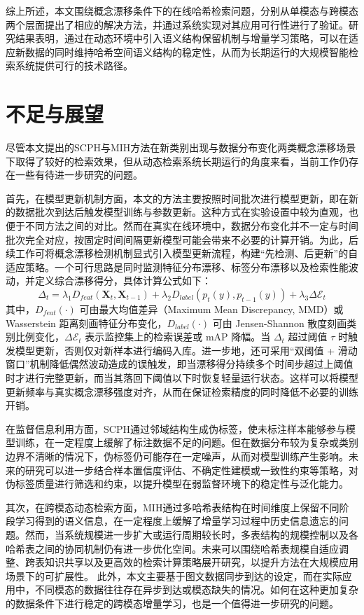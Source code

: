 综上所述，本文围绕概念漂移条件下的在线哈希检索问题，分别从单模态与跨模态两个层面提出了相应的解决方法，并通过系统实现对其应用可行性进行了验证。研究结果表明，通过在动态环境中引入语义结构保留机制与增量学习策略，可以在适应新数据的同时维持哈希空间语义结构的稳定性，从而为长期运行的大规模智能检索系统提供可行的技术路径。

\section{不足与展望}
尽管本文提出的SCPH与MIH方法在新类别出现与数据分布变化两类概念漂移场景下取得了较好的检索效果，但从动态检索系统长期运行的角度来看，当前工作仍存在一些有待进一步研究的问题。

首先，在模型更新机制方面，本文的方法主要按照时间批次进行模型更新，即在新的数据批次到达后触发模型训练与参数更新。这种方式在实验设置中较为直观，也便于不同方法之间的对比。然而在真实在线环境中，数据分布变化并不一定与时间批次完全对应，按固定时间间隔更新模型可能会带来不必要的计算开销。为此，后续工作可将概念漂移检测机制显式引入模型更新流程，构建“先检测、后更新”的自适应策略。一个可行思路是同时监测特征分布漂移、标签分布漂移以及检索性能波动，并定义综合漂移得分，具体计算公式如下：
\begin{equation}
  \Delta_t = \lambda_1 D_{feat}(\mathbf{X}_t,\mathbf{X}_{t-1}) + \lambda_2 D_{label}(p_t(y),p_{t-1}(y)) + \lambda_3 \Delta \mathcal{E}_t
\end{equation}
其中，$D_{feat}(\cdot)$ 可由最大均值差异（Maximum Mean Discrepancy, MMD）或 Wasserstein 距离刻画特征分布变化，$D_{label}(\cdot)$ 可由 Jensen-Shannon 散度刻画类别比例变化，$\Delta \mathcal{E}_t$ 表示监控集上的检索误差或 mAP 降幅。当 $\Delta_t$ 超过阈值 $\tau$ 时触发模型更新，否则仅对新样本进行编码入库。进一步地，还可采用“双阈值 + 滑动窗口”机制降低偶然波动造成的误触发，即当漂移得分持续多个时间步超过上阈值时才进行完整更新，而当其落回下阈值以下时恢复轻量运行状态。这样可以将模型更新频率与真实概念漂移强度对齐，从而在保证检索精度的同时降低不必要的训练开销。

在监督信息利用方面，SCPH通过邻域结构生成伪标签，使未标注样本能够参与模型训练，在一定程度上缓解了标注数据不足的问题。但在数据分布较为复杂或类别边界不清晰的情况下，伪标签仍可能存在一定噪声，从而对模型训练产生影响。未来的研究可以进一步结合样本置信度评估、不确定性建模或一致性约束等策略，对伪标签质量进行筛选和约束，以提升模型在弱监督环境下的稳定性与泛化能力。

其次，在跨模态动态检索方面，MIH通过多哈希表结构在时间维度上保留不同阶段学习得到的语义信息，在一定程度上缓解了增量学习过程中历史信息遗忘的问题。然而，当系统规模进一步扩大或运行周期较长时，多表结构的规模控制以及各哈希表之间的协同机制仍有进一步优化空间。未来可以围绕哈希表规模自适应调整、跨表知识共享以及更高效的检索计算策略展开研究，以提升方法在大规模应用场景下的可扩展性。
此外，本文主要基于图文数据同步到达的设定，而在实际应用中，不同模态的数据往往存在异步到达或模态缺失的情况。如何在这种更加复杂的数据条件下进行稳定的跨模态增量学习，也是一个值得进一步研究的问题。


